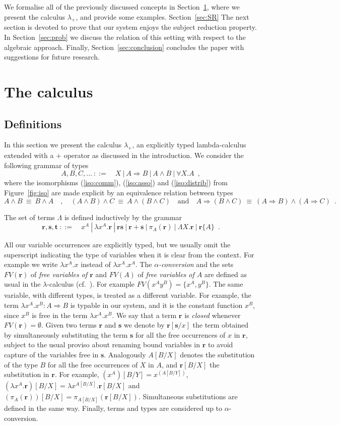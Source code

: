 \documentclass[final,copyright,creativecommons]{eptcs}
\newcommand{\OurCalculus}{\ensuremath{\lambda_+}}
\newcommand{\ve}[1]{\ensuremath{\mathrm{\textbf{#1}}}}
\theoremstyle{definition}
\begin{document}
We formalise all of the previously discussed concepts in Section~\ref{sec:calculus}, where we present the calculus \OurCalculus, and provide some examples. Section~\ref{sec:SR} The next section is devoted to prove that our system enjoys the subject reduction property. In Section~\ref{sec:prob} we discuss the relation of this setting with respect to the algebraic approach. Finally, Section~\ref{sec:conclusion} concludes the paper with suggestions for future research.

\section{The calculus}\label{sec:calculus}
\subsection{Definitions}
In this section we present the calculus \OurCalculus, an explicitly typed lambda-calculus extended with a $+$ operator as discussed in the introduction.
We consider the following grammar of types
$$A,B,C,\dots\ ::=\quad X~|~A\Rightarrow B~|~A\wedge B~|~\forall X.A\enspace,$$
where the isomorphisms (\ref{iso:comm}), (\ref{iso:asso}) and (\ref{iso:distrib}) from Figure~\ref{fig:iso} are made explicit by an equivalence relation between types
$$A\wedge B~\equiv~ B\wedge A\quad ,\quad
(A\wedge B)\wedge C~\equiv~ A\wedge(B\wedge C)\quad \mbox{and}\quad
A\Rightarrow (B\wedge C)~\equiv~ (A\Rightarrow B)\wedge(A\Rightarrow C)\enspace.$$

The set of terms $\Lambda$ is defined inductively by the grammar
$$\ve r,\ve s,\ve t\ ::=\quad x^A~|~\lambda x^A.\ve r~|~\ve r\ve s~|~\ve r+\ve s~|~\pi_{A}(\ve r)~|~\Lambda X.\ve r~|~\ve r\{A\}\enspace.$$

All our variable occurrences are explicitly typed, but we usually omit the superscript indicating the type of variables when it is clear from the context. For example we write $\lambda x^A.x$ instead of $\lambda x^A.x^A$.
The {\em $\alpha$-conversion} and the sets $FV(\ve r)$ of {\em free variables of $\ve r$} and $FV(A)$ of {\em free variables of $A$} are defined as usual in the $\lambda$-calculus (cf.~\cite[\S2.1]{Barendregt84}). For example $FV(x^Ay^B)=\{x^A,y^B\}$.
The same variable, with different types, is treated as a different variable. For example, the term $\lambda x^A.x^B:A\Rightarrow B$ is typable in our system, and it is the constant function $x^B$, since $x^B$ is free in the term $\lambda x^A.x^B$.
We say that a term $\ve r$ is {\em closed} whenever $FV(\ve r)=\emptyset$. Given two terms $\ve r$ and $\ve s$ we denote by $\ve r[\ve s/x]$ the term obtained by simultaneously substituting the term $\ve s$ for all the free occurrences of $x$ in $\ve r$, subject to the usual proviso about renaming bound variables in $\ve r$ to avoid capture of the variables free in $\ve s$. Analogously $A[B/X]$ denotes the substitution of the type $B$ for all the free occurrences of $X$ in $A$, and $\ve r[B/X]$ the substitution in $\ve r$. For example, $(x^A)[B/Y]=x^{(A[B/Y])}$, $(\lambda x^A.\ve r)[B/X]=\lambda x^{A[B/X]}.\ve r[B/X]$ and $(\pi_A(\ve r))[B/X]=\pi_{A[B/X]}(\ve r[B/X])$. Simultaneous substitutions are defined in the same way. Finally, terms and types are considered up to $\alpha$-conversion.
\end{document}

